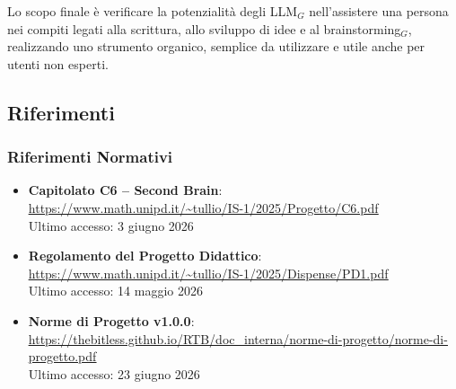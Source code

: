 \documentclass[a4paper, 10pt, colorlinks=true, linkcolor=black, urlcolor=blue, citecolor=blue, hidelinks]{article}
\newcommand{\reflink}[1]{{\footnotesize\underline{\url{#1}}}}
\begin{document}
Lo scopo finale è verificare la potenzialità degli LLM$_G$ nell'assistere una persona nei compiti legati alla scrittura, allo sviluppo di idee e al brainstorming$_G$, realizzando uno strumento organico, semplice da utilizzare e utile anche per utenti non esperti.


\subsection{Riferimenti}

\subsubsection{Riferimenti Normativi}
\begin{itemize}
    \item \textbf{Capitolato C6 -- Second Brain}: \\
    \reflink{https://www.math.unipd.it/~tullio/IS-1/2025/Progetto/C6.pdf} \\
    Ultimo accesso: 3 giugno 2026

    \item \textbf{Regolamento del Progetto Didattico}: \\
    \reflink{https://www.math.unipd.it/~tullio/IS-1/2025/Dispense/PD1.pdf} \\
    Ultimo accesso: 14 maggio 2026

    \item \textbf{Norme di Progetto v1.0.0}: \\
    \reflink{https://thebitless.github.io/RTB/doc_interna/norme-di-progetto/norme-di-progetto.pdf} \\
    Ultimo accesso: 23 giugno 2026
\end{itemize}
\end{document}
